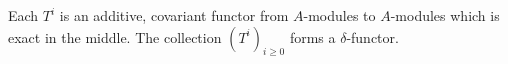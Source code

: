 Each $T^i$ is an additive, covariant functor from $A$-modules to $A$-modules which is exact in the middle. The collection $(T^i)_{i \geqslant 0}$ forms a $\delta$-functor.
